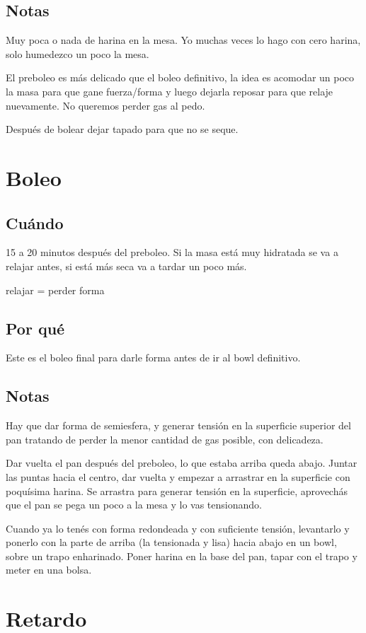 \documentclass[10pt,a4paper]{article}
\begin{document}
\subsection*{Notas}
Muy poca o nada de harina en la mesa. Yo muchas veces lo hago con cero harina,
solo humedezco un poco la mesa.

El preboleo es más delicado que el boleo definitivo, la idea es acomodar un poco
la masa para que gane fuerza/forma y luego dejarla reposar para que relaje
nuevamente. No queremos perder gas al pedo.

Después de bolear dejar tapado para que no se seque.

\section{Boleo}
\subsection*{Cuándo}
15 a 20 minutos después del preboleo. Si la masa está muy hidratada se va a
relajar antes, si está más seca va a tardar un poco más.

relajar = perder forma
\subsection*{Por qué}
Este es el boleo final para darle forma antes de ir al bowl definitivo.
\subsection*{Notas}
Hay que dar forma de semiesfera, y generar tensión en la superficie superior del pan tratando de perder la menor cantidad de gas posible, con delicadeza.

Dar vuelta el pan después del preboleo, lo que estaba arriba queda abajo. Juntar
las puntas hacia el centro, dar vuelta y empezar a arrastrar en la superficie
con poquísima harina. Se arrastra para generar tensión en la superficie,
aprovechás que el pan se pega un poco a la mesa y lo vas tensionando.

Cuando ya lo tenés con forma redondeada y con suficiente tensión, levantarlo y
ponerlo con la parte de arriba (la tensionada y lisa) hacia abajo en un bowl,
sobre un trapo enharinado. Poner harina en la base del pan, tapar con el trapo y
meter en una bolsa.

\section{Retardo}
\end{document}
